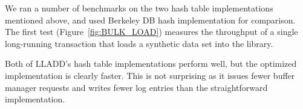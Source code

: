 \documentclass[10pt,letterpaper,twocolumn,english]{article}
\newcommand{\yad}{LLADD\xspace}
\newcommand{\eab}[1]{\textcolor{red}{\bf EAB: #1}}
\begin{document}
We ran a number of benchmarks on the two hash table implementations
mentioned above, and used Berkeley DB hash implementation for comparison.
The first test (Figure~\ref{fig:BULK_LOAD}) measures the throughput of
a single long-running
transaction that loads a synthetic data set into the
library. 

Both of \yad's hash table implementations perform well, but the
optimized implementation is clearly faster.  This is not surprising as
it issues fewer buffer manager requests and writes fewer log entries
than the straightforward implementation.



\end{document}
